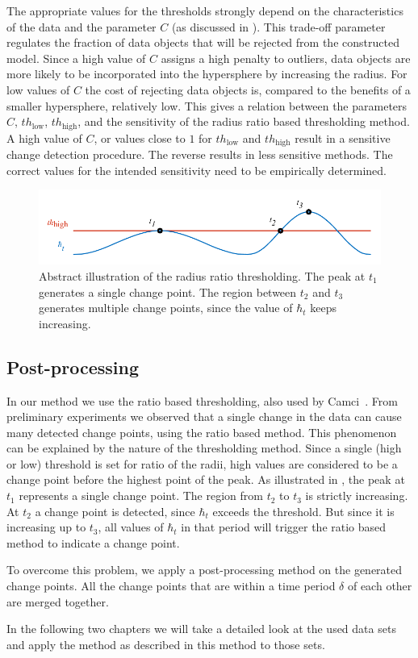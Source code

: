 The appropriate values for the thresholds strongly depend on the characteristics of the data and the parameter $C$ (as discussed in ).
This trade-off parameter regulates the fraction of data objects that will be rejected from the constructed model.
Since a high value of $C$ assigns a high penalty to outliers, data objects are more likely to be incorporated into the hypersphere by increasing the radius.
For low values of $C$ the cost of rejecting data objects is, compared to the benefits of a smaller hypersphere, relatively low.
This gives a relation between the parameters $C$, $th_\text{low}$, $th_\text{high}$, and the sensitivity of the radius ratio based thresholding method.
A high value of $C$, or values close to $1$ for $th_\text{low}$ and $th_\text{high}$ result in a sensitive change detection procedure.
The reverse results in less sensitive methods.
The correct values for the intended sensitivity need to be empirically determined.

\begin{figure}
  \centering
    \includegraphics[width=\textwidth,height=\textheight,keepaspectratio]{./Figures/chapter4/signal_threshold.pdf}
  \caption[Thresholding]{Abstract illustration of the radius ratio thresholding. The peak at $t_1$ generates a single change point. The region between $t_2$ and $t_3$ generates multiple change points, since the value of $\hbar_t$ keeps increasing.}
  \label{fig:tresholding}
\end{figure}

\subsection{Post-processing}
In our method we use the ratio based thresholding, also used by Camci~\cite{camci2010change}.
From preliminary experiments we observed that a single change in the data can cause many detected change points, using the ratio based method.
This phenomenon can be explained by the nature of the thresholding method.
Since a single (high or low) threshold is set for ratio of the radii, high values are considered to be a change point before the highest point of the peak.
As illustrated in , the peak at $t_1$ represents a single change point.
The region from $t_2$ to $t_3$ is strictly increasing.
At $t_2$ a change point is detected, since $\hbar_t$ exceeds the threshold.
But since it is increasing up to $t_3$, all values of $\hbar_t$ in that period will trigger the ratio based method to indicate a change point.

To overcome this problem, we apply a post-processing method on the generated change points.
All the change points that are within a time period $\delta$ of each other are merged together.

In the following two chapters we will take a detailed look at the used data sets and apply the method as described in this method to those sets.